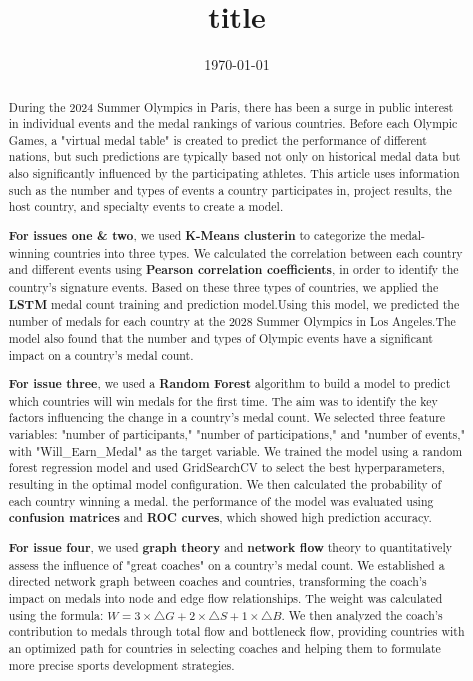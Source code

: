 \documentclass{mcmthesis}
\title{{\bf title}}
\date{\today}
\begin{document}
\begin{abstract}

    During the 2024 Summer Olympics in Paris, there has been a surge in public interest in individual events and the medal rankings of various countries. Before each Olympic Games, a "virtual medal table" is created to predict the performance of different nations, but such predictions are typically based not only on historical medal data but also significantly influenced by the participating athletes. This article uses information such as the number and types of events a country participates in, project results, the host country, and specialty events to create a model.

    {\bf For issues one \& two}, we used {\bf K-Means clusterin} to categorize  the medal-winning countries into three types. We calculated the correlation between each country and different events using {\bf Pearson correlation coefficients}, in order to identify the country's signature events. Based on these three types of countries, we applied the {\bf LSTM} medal count training and prediction model.Using this model, we predicted the number of medals for each country at the 2028 Summer Olympics in Los Angeles.The model also found that the number and types of Olympic events have a significant impact on a country's medal count.

    {\bf For issue three}, we used a {\bf Random Forest} algorithm to build a model to predict which countries will win medals for the first time. The aim was to identify the key factors influencing the change in a country's medal count. We selected three feature variables: "number of participants," "number of participations," and "number of events," with "Will\_Earn\_Medal" as the target variable. We trained the model using a random forest regression model and used GridSearchCV to select the best hyperparameters, resulting in the optimal model configuration. We then calculated the probability of each country winning a medal.  the performance of the model was evaluated using {\bf confusion matrices} and {\bf ROC curves}, which showed high prediction accuracy.

    {\bf For issue four}, we used {\bf graph theory} and {\bf network flow} theory to quantitatively assess the influence of "great coaches" on a country's medal count. We established a directed network graph between coaches and countries, transforming the coach's impact on medals into node and edge flow relationships. The weight was calculated using the formula: $W=3\times \triangle G+2\times \triangle S+1\times \triangle B$. We then analyzed the coach's contribution to medals through total flow and bottleneck flow, providing countries with an optimized path for countries in selecting coaches and helping them to formulate more precise sports development strategies.
   

\end{abstract}
\end{document}
